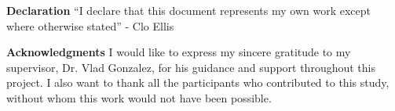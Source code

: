 \textbf{Declaration}
“I declare that this document represents my own work except where otherwise stated” - Clo Ellis

\textbf{Acknowledgments}
I would like to express my sincere gratitude to my supervisor, Dr. Vlad Gonzalez, for his guidance and support throughout this project. 
I also want to thank all the participants who contributed to this study, without whom this work would not have been possible.